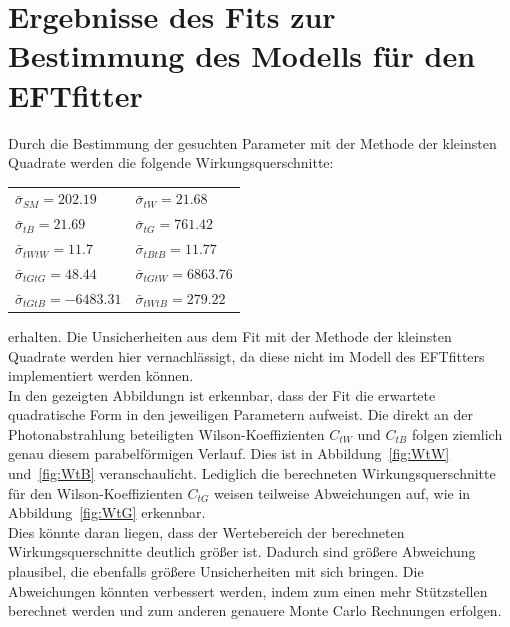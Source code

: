 \section{Ergebnisse des Fits zur Bestimmung des Modells für den EFTfitter}
\label{Modell}
Durch die Bestimmung der gesuchten Parameter mit der Methode der kleinsten Quadrate werden die folgende Wirkungsquerschnitte:
\begin{table}[H]
    \centering
   \begin{tabular}{ll}
     $\bar{\sigma}_{SM}   = 202.19 $  & $\bar{\sigma}_{tW}   = 21.68$\\
     $\bar{\sigma}_{tB}   = 21.69$    & $\bar{\sigma}_{tG}   = 761.42$\\
     $\bar{\sigma}_{tWtW} = 11.7 $    & $\bar{\sigma}_{tBtB} = 11.77$\\
     $\bar{\sigma}_{tGtG} = 48.44$    & $\bar{\sigma}_{tGtW} = 6863.76$\\
     $\bar{\sigma}_{tGtB} = -6483.31$ & $\bar{\sigma}_{tWtB} = 279.22$
   \end{tabular}
\end{table}
erhalten. Die Unsicherheiten aus dem Fit mit der Methode der kleinsten Quadrate werden hier vernachlässigt, da diese nicht im Modell des EFTfitters implementiert werden können.\\
In den gezeigten Abbildungn ist erkennbar, dass der Fit die erwartete quadratische Form in den jeweiligen Parametern aufweist. Die direkt an der Photonabstrahlung beteiligten Wilson-Koeffizienten $C_{tW}$ und $C_{tB}$ folgen ziemlich genau diesem parabelförmigen Verlauf. Dies ist in Abbildung~\ref{fig:WtW} und~\ref{fig:WtB} veranschaulicht. Lediglich die berechneten Wirkungsquerschnitte für den Wilson-Koeffizienten $C_{tG}$ weisen teilweise Abweichungen auf, wie in Abbildung~\ref{fig:WtG} erkennbar.\\
Dies könnte daran liegen, dass der Wertebereich der berechneten Wirkungsquerschnitte deutlich größer ist. Dadurch sind größere Abweichung plausibel, die ebenfalls größere Unsicherheiten mit sich bringen. Die Abweichungen könnten verbessert werden, indem zum einen mehr Stützstellen berechnet werden und zum anderen genauere Monte Carlo Rechnungen erfolgen.\\
